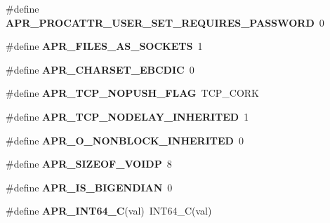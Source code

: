 \begin{DoxyCompactItemize}
\item 
\hypertarget{group__apr__platform_ga0108ca8b595e62174e8b42cce0d063f5}{\#define {\bfseries A\-P\-R\-\_\-\-P\-R\-O\-C\-A\-T\-T\-R\-\_\-\-U\-S\-E\-R\-\_\-\-S\-E\-T\-\_\-\-R\-E\-Q\-U\-I\-R\-E\-S\-\_\-\-P\-A\-S\-S\-W\-O\-R\-D}~0}\label{group__apr__platform_ga0108ca8b595e62174e8b42cce0d063f5}

\item 
\hypertarget{group__apr__platform_gace899f1ccb69c00ae7c65212ca5890b1}{\#define {\bfseries A\-P\-R\-\_\-\-F\-I\-L\-E\-S\-\_\-\-A\-S\-\_\-\-S\-O\-C\-K\-E\-T\-S}~1}\label{group__apr__platform_gace899f1ccb69c00ae7c65212ca5890b1}

\item 
\hypertarget{group__apr__platform_ga8c71221bae49df0b88a0f725e96c681f}{\#define {\bfseries A\-P\-R\-\_\-\-C\-H\-A\-R\-S\-E\-T\-\_\-\-E\-B\-C\-D\-I\-C}~0}\label{group__apr__platform_ga8c71221bae49df0b88a0f725e96c681f}

\item 
\hypertarget{group__apr__platform_ga6e74a453e90a6495a981f5f312ec6beb}{\#define {\bfseries A\-P\-R\-\_\-\-T\-C\-P\-\_\-\-N\-O\-P\-U\-S\-H\-\_\-\-F\-L\-A\-G}~T\-C\-P\-\_\-\-C\-O\-R\-K}\label{group__apr__platform_ga6e74a453e90a6495a981f5f312ec6beb}

\item 
\hypertarget{group__apr__platform_ga22df092ebdce7f9f8c6611d974a4ae82}{\#define {\bfseries A\-P\-R\-\_\-\-T\-C\-P\-\_\-\-N\-O\-D\-E\-L\-A\-Y\-\_\-\-I\-N\-H\-E\-R\-I\-T\-E\-D}~1}\label{group__apr__platform_ga22df092ebdce7f9f8c6611d974a4ae82}

\item 
\hypertarget{group__apr__platform_gac6a178e9f749311c8f3a98da3dfd321d}{\#define {\bfseries A\-P\-R\-\_\-\-O\-\_\-\-N\-O\-N\-B\-L\-O\-C\-K\-\_\-\-I\-N\-H\-E\-R\-I\-T\-E\-D}~0}\label{group__apr__platform_gac6a178e9f749311c8f3a98da3dfd321d}

\item 
\hypertarget{group__apr__platform_gaa7a2a1de7949f09e29edae60b0d4c27f}{\#define {\bfseries A\-P\-R\-\_\-\-S\-I\-Z\-E\-O\-F\-\_\-\-V\-O\-I\-D\-P}~8}\label{group__apr__platform_gaa7a2a1de7949f09e29edae60b0d4c27f}

\item 
\hypertarget{group__apr__platform_gabf5174c5d522e1a149cbb38a4310743f}{\#define {\bfseries A\-P\-R\-\_\-\-I\-S\-\_\-\-B\-I\-G\-E\-N\-D\-I\-A\-N}~0}\label{group__apr__platform_gabf5174c5d522e1a149cbb38a4310743f}

\item 
\hypertarget{group__apr__platform_gaae749817bb595cd5dcb9c17c119ddb13}{\#define {\bfseries A\-P\-R\-\_\-\-I\-N\-T64\-\_\-\-C}(val)~I\-N\-T64\-\_\-\-C(val)}\label{group__apr__platform_gaae749817bb595cd5dcb9c17c119ddb13}


\end{DoxyCompactItemize}
